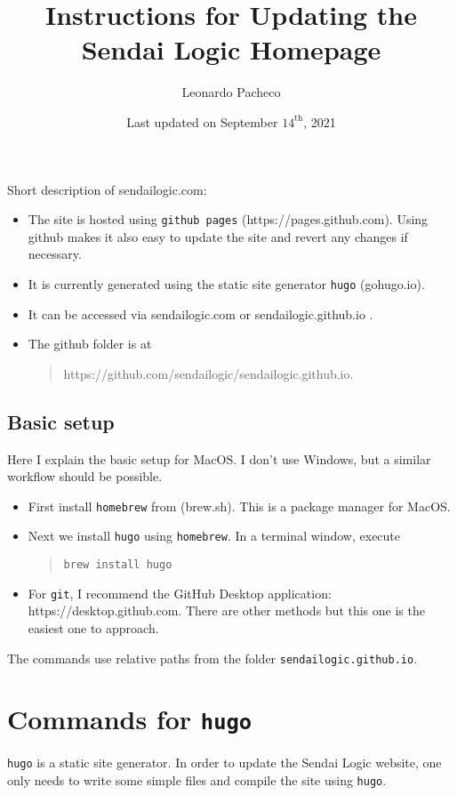\documentclass[a4paper]{article}
\title{Instructions for Updating the Sendai Logic Homepage}
\author{Leonardo Pacheco}
\date{Last updated on September $14^\mathrm{th}$, 2021}
\begin{document}
\maketitle

Short description of sendailogic.com:
\begin{itemize}
     \item The site is hosted using \texttt{github pages} (https://pages.github.com). Using github makes it also easy to update the site and revert any changes if necessary.
     \item It is currently generated using the static site generator \texttt{hugo} (gohugo.io).
     \item It can be accessed via sendailogic.com or sendailogic.github.io .
     \item The github folder is at
\begin{quote}
    https://github.com/sendailogic/sendailogic.github.io.
\end{quote}
\end{itemize}

\subsection{Basic setup}
Here I explain the basic setup for MacOS. {\color{red} I don't use Windows, but a similar workflow should be possible.}
\begin{itemize}
    \item First install \texttt{homebrew} from (brew.sh). This is a package manager for MacOS.
    \item Next we install \texttt{hugo} using \texttt{homebrew}. In a terminal window, execute
    \begin{quote}
        \texttt{brew install hugo}
    \end{quote}
    \item For \texttt{git}, I recommend the GitHub Desktop application: https://desktop.github.com. There are other methods but this one is the easiest one to approach.
\end{itemize}

The commands use relative paths from the folder \texttt{sendailogic.github.io}.


\section{Commands for \texttt{hugo}}
\texttt{hugo} is a static site generator.
In order to update the Sendai Logic website, one only needs to write some simple files and compile the site using \texttt{hugo}.
\end{document}
